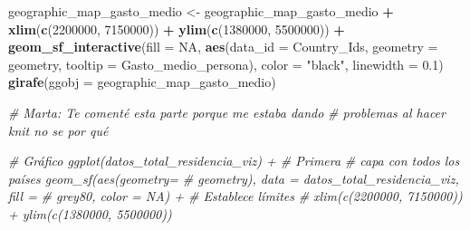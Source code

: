 \documentclass[data,article,submit,moreauthors,pdftex]{Definitions/mdpi}
\newenvironment{Shaded}{\begin{snugshade}}{\end{snugshade}}
\newcommand{\AttributeTok}[1]{\textcolor[rgb]{0.13,0.29,0.53}{#1}}
\newcommand{\CommentTok}[1]{\textcolor[rgb]{0.56,0.35,0.01}{\textit{#1}}}
\newcommand{\ConstantTok}[1]{\textcolor[rgb]{0.56,0.35,0.01}{#1}}
\newcommand{\DecValTok}[1]{\textcolor[rgb]{0.00,0.00,0.81}{#1}}
\newcommand{\FloatTok}[1]{\textcolor[rgb]{0.00,0.00,0.81}{#1}}
\newcommand{\FunctionTok}[1]{\textcolor[rgb]{0.13,0.29,0.53}{\textbf{#1}}}
\newcommand{\NormalTok}[1]{#1}
\newcommand{\OtherTok}[1]{\textcolor[rgb]{0.56,0.35,0.01}{#1}}
\newcommand{\SpecialCharTok}[1]{\textcolor[rgb]{0.81,0.36,0.00}{\textbf{#1}}}
\newcommand{\StringTok}[1]{\textcolor[rgb]{0.31,0.60,0.02}{#1}}
\begin{document}
\begin{Shaded}
\begin{Highlighting}[]
\NormalTok{geographic\_map\_gasto\_medio }\OtherTok{\textless{}{-}}\NormalTok{ geographic\_map\_gasto\_medio }\SpecialCharTok{+} \FunctionTok{xlim}\NormalTok{(}\FunctionTok{c}\NormalTok{(}\DecValTok{2200000}\NormalTok{,}
    \DecValTok{7150000}\NormalTok{)) }\SpecialCharTok{+} \FunctionTok{ylim}\NormalTok{(}\FunctionTok{c}\NormalTok{(}\DecValTok{1380000}\NormalTok{, }\DecValTok{5500000}\NormalTok{)) }\SpecialCharTok{+} \FunctionTok{geom\_sf\_interactive}\NormalTok{(}\AttributeTok{fill =} \ConstantTok{NA}\NormalTok{,}
    \FunctionTok{aes}\NormalTok{(}\AttributeTok{data\_id =}\NormalTok{ Country\_Ids, }\AttributeTok{geometry =}\NormalTok{ geometry, }\AttributeTok{tooltip =}\NormalTok{ Gasto\_medio\_persona),}
    \AttributeTok{color =} \StringTok{"black"}\NormalTok{, }\AttributeTok{linewidth =} \FloatTok{0.1}\NormalTok{)}
\FunctionTok{girafe}\NormalTok{(}\AttributeTok{ggobj =}\NormalTok{ geographic\_map\_gasto\_medio)}
\end{Highlighting}
\end{Shaded}

\begin{Shaded}
\begin{Highlighting}[]
\CommentTok{\# Marta: Te comenté esta parte porque me estaba dando}
\CommentTok{\# problemas al hacer knit no se por qué}

\CommentTok{\# Gráfico ggplot(datos\_total\_residencia\_viz) + \# Primera}
\CommentTok{\# capa con todos los países geom\_sf(aes(geometry=}
\CommentTok{\# geometry), data = datos\_total\_residencia\_viz, fill =}
\CommentTok{\# \textquotesingle{}grey80\textquotesingle{}, color = NA) + \# Establece límites}
\CommentTok{\# xlim(c(2200000, 7150000)) + ylim(c(1380000, 5500000))}
\end{Highlighting}
\end{Shaded}
\end{document}
